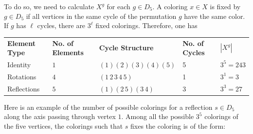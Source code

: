\begin{example}
To do so, we need to calculate $X^g$ for each $g \in D_5$. A coloring $x \in X$ is fixed by $g \in D_5$ if all vertices in the same cycle of the permutation $g$ have the same color. If $g$ has $\ell$ cycles, there are $3^{\ell}$ fixed colorings. Therefore, one has
\begin{center}
\begin{tabular}{lllll}
\textbf{Element Type} & \textbf{No. of Elements} & \textbf{Cycle Structure} & \textbf{No. of Cycles} & $|X^g|$ \\ 
Identity & $1$ & $(1)(2)(3)(4)(5)$ & 5 & $3^5 = 243$ \\
Rotations & $4$ & $(1\,2\,3\,4\,5)$ & 1 & $3^1 = 3$ \\
Reflections & $5$ & $(1)(2\,5)(3\,4)$ & 3 & $3^3 = 27$ \\ 
\end{tabular}
\end{center}

Here is an example of the number of possible colorings for a reflection $s \in D_5$ along the axis passing through vertex $1$. Among all the possible $3^5$ colorings of the five vertices, the colorings such that $s$ fixes the coloring is of the form:
\begin{center}
\end{center}
\end{example}
